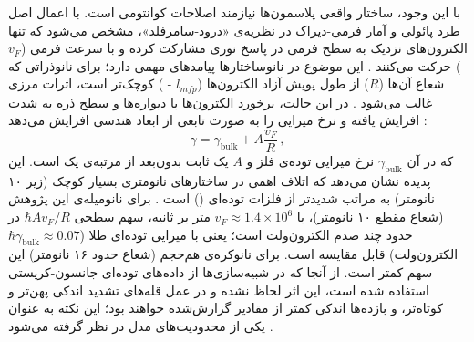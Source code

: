 \documentclass[12pt,a4paper]{report}
\newcommand{\sub}[1]{\mathrm{#1}}               %
\begin{document}
با این وجود، ساختار واقعی پلاسمون‌ها نیازمند اصلاحات کوانتومی است. با اعمال اصل طرد پائولی و آمار فرمی-دیراک در نظریه‌ی «درود-سامرفلد»، مشخص می‌شود که تنها الکترون‌های نزدیک به سطح فرمی در پاسخ نوری مشارکت کرده و با سرعت فرمی ($v_F$) حرکت می‌کنند \cite{maier,novotny}. این موضوع در نانوساختارها پیامدهای مهمی دارد؛ برای نانوذراتی که شعاع آن‌ها ($R$) از طول پویش آزاد الکترون‌ها ($l_{mfp}$ - ) کوچک‌تر است، اثرات مرزی غالب می‌شود \cite{maier,kreibig}. در این حالت، برخورد الکترون‌ها با دیواره‌ها و سطح ذره به شدت افزایش یافته و نرخ میرایی را به صورت تابعی از ابعاد هندسی افزایش می‌دهد \cite{kreibig,maier}:
\begin{equation}
\gamma=\gamma_{\sub{bulk}}+A\frac{v_F}{R}\,,
\end{equation}
که در آن $\gamma_{\sub{bulk}}$ نرخ میرایی توده‌ی فلز و $A$ یک ثابت بدون‌بعد از مرتبه‌ی یک است. این پدیده نشان می‌دهد که اتلاف اهمی در ساختارهای نانومتری بسیار کوچک (زیر ۱۰ نانومتر) به مراتب شدیدتر از فلزات توده‌ای () است \cite{maier,kreibig}. برای نانومیله‌ی این پژوهش (شعاع مقطع ۱۰ نانومتر)، با $v_F\approx1.4\times10^{6}$ متر بر ثانیه، سهم سطحی $\hbar Av_F/R$ در حدود چند صدم الکترون‌ولت است؛ یعنی با میرایی توده‌ای طلا ($\hbar\gamma_{\sub{bulk}}\approx0.07$ الکترون‌ولت) قابل مقایسه است. برای نانوکره‌ی هم‌حجم (شعاع حدود ۱۶ نانومتر) این سهم کمتر است. از آنجا که در شبیه‌سازی‌ها از داده‌های توده‌ای جانسون-کریستی استفاده شده است، این اثر لحاظ نشده و در عمل قله‌های تشدید اندکی پهن‌تر و کوتاه‌تر، و بازده‌ها اندکی کمتر از مقادیر گزارش‌شده خواهند بود؛ این نکته به عنوان یکی از محدودیت‌های مدل در نظر گرفته می‌شود \cite{kreibig,jc}.
\end{document}
